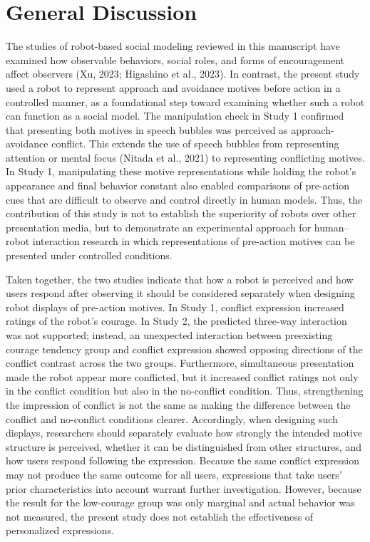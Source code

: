\documentclass[utf8]{FrontiersinHarvard}
\begin{document}
\section{General Discussion}\label{general-discussion}

The studies of robot-based social modeling reviewed in this manuscript have examined how observable behaviors, social roles, and forms of encouragement affect observers (Xu, 2023; Higashino et al., 2023). In contrast, the present study used a robot to represent approach and avoidance motives before action in a controlled manner, as a foundational step toward examining whether such a robot can function as a social model. The manipulation check in Study 1 confirmed that presenting both motives in speech bubbles was perceived as approach-avoidance conflict. This extends the use of speech bubbles from representing attention or mental focus (Nitada et al., 2021) to representing conflicting motives. In Study 1, manipulating these motive representations while holding the robot's appearance and final behavior constant also enabled comparisons of pre-action cues that are difficult to observe and control directly in human models. Thus, the contribution of this study is not to establish the superiority of robots over other presentation media, but to demonstrate an experimental approach for human--robot interaction research in which representations of pre-action motives can be presented under controlled conditions.

Taken together, the two studies indicate that how a robot is perceived and how users respond after observing it should be considered separately when designing robot displays of pre-action motives. In Study 1, conflict expression increased ratings of the robot's courage. In Study 2, the predicted three-way interaction was not supported; instead, an unexpected interaction between preexisting courage tendency group and conflict expression showed opposing directions of the conflict contrast across the two groups. Furthermore, simultaneous presentation made the robot appear more conflicted, but it increased conflict ratings not only in the conflict condition but also in the no-conflict condition. Thus, strengthening the impression of conflict is not the same as making the difference between the conflict and no-conflict conditions clearer. Accordingly, when designing such displays, researchers should separately evaluate how strongly the intended motive structure is perceived, whether it can be distinguished from other structures, and how users respond following the expression. Because the same conflict expression may not produce the same outcome for all users, expressions that take users' prior characteristics into account warrant further investigation. However, because the result for the low-courage group was only marginal and actual behavior was not measured, the present study does not establish the effectiveness of personalized expressions.
\end{document}
